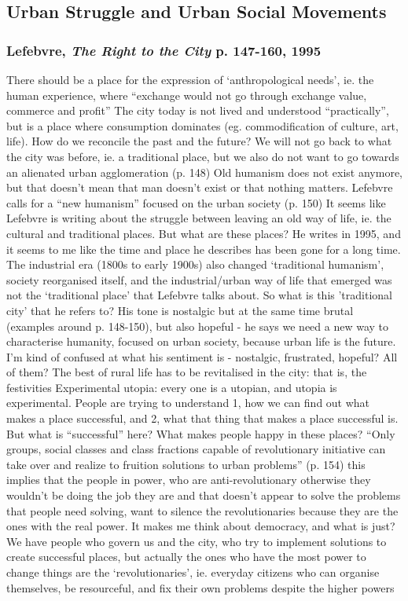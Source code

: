 \documentclass{article}
\begin{document}
\subsection{Urban Struggle and Urban Social Movements}


\subsubsection{Lefebvre, \textit{The Right to the City} p. 147-160, 1995}

\begin{outline}
	\1 There should be a place for the expression of `anthropological needs', ie. the human experience, where ``exchange would not go through exchange value, commerce and profit''
	\1 The city today is not lived and understood ``practically'', but is a place where consumption dominates (eg. commodification of culture, art, life). How do we reconcile the past and the future? We will not go back to what the city was before, ie. a traditional place, but we also do not want to go towards an alienated urban agglomeration (p. 148)
	\1 Old humanism does not exist anymore, but that doesn't mean that man doesn't exist or that nothing matters. Lefebvre calls for a ``new humanism'' focused on the urban society (p. 150) 
	\1 It seems like Lefebvre is writing about the struggle between leaving an old way of life, ie. the cultural and traditional places. But what are these places? He writes in 1995, and it seems to me like the time and place he describes has been gone for a long time. The industrial era (1800s to early 1900s) also changed `traditional humanism', society reorganised itself, and the industrial/urban way of life that emerged was not the `traditional place' that Lefebvre talks about. So what is this 'traditional city' that he refers to?
	His tone is nostalgic but at the same time brutal (examples around p. 148-150), but also hopeful - he says we need a new way to characterise humanity, focused on urban society, because urban life is the future. I'm kind of confused at what his sentiment is - nostalgic, frustrated, hopeful? All of them? 
	\1 The best of rural life has to be revitalised in the city: that is, the festivities 
	\1 Experimental utopia: every one is a utopian, and utopia is experimental. People are trying to understand 1, how we can find out what  makes a place successful, and 2, what that thing that makes a place successful is. But what is ``successful'' here? What makes people happy in these places?
	\1 ``Only groups, social classes and class fractions capable of revolutionary initiative can take over and realize to fruition solutions to urban problems'' (p. 154) this implies that the people in power, who are anti-revolutionary otherwise they wouldn't be doing the job they are and that doesn't appear to solve the problems that people need solving, want to silence the revolutionaries because they are the ones with the real power. It makes me think about democracy, and what is just? We have people who govern us and the city, who try to implement solutions to create successful places, but actually the ones who have the most power to change things are the `revolutionaries', ie. everyday citizens who can organise themselves, be resourceful, and fix their own problems despite the higher powers

\end{outline}
\end{document}
